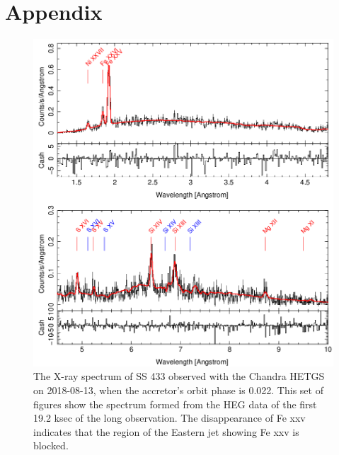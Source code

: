 \chapter*{Appendix}

\begin{figure}[t]
    \centering
        \includegraphics[width = \linewidth]{Chapters/Figures/long_pheno0_heg.png}
        \caption{The X-ray spectrum of SS 433 observed with the Chandra HETGS on 2018-08-13, when the accretor's orbit phase is 0.022. This set of figures show the spectrum formed from the HEG data of the first 19.2 ksec of the long observation. The disappearance of Fe {\sc xxv} indicates that the region of the Eastern jet showing Fe {\sc xxv} is blocked.}
    \label{long_pheno0_heg}
\end{figure}


